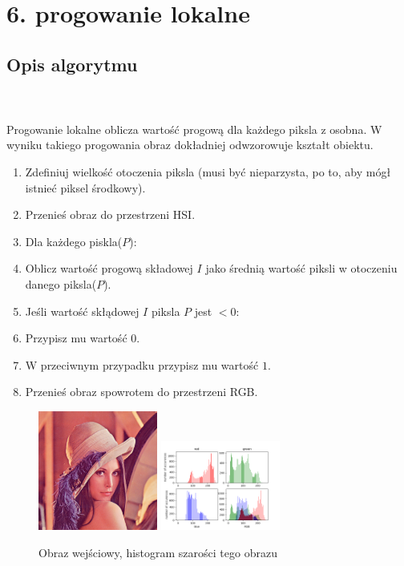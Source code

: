 \documentclass[final,a4paper,openany,12pt]{mwbk}
\begin{document}
\section*{6. progowanie lokalne}
\subsection*{Opis algorytmu}
\hfill
\\\\
\indent Progowanie lokalne oblicza wartość progową dla każdego piksla z osobna. W wyniku takiego progowania obraz dokładniej odwzorowuje kształt obiektu.
\begin{enumerate}
	\item Zdefiniuj wielkość otoczenia piksla (musi być nieparzysta, po to, aby mógł istnieć piksel środkowy).
	\item Przenieś obraz do przestrzeni HSI.
	\item Dla każdego piskla($P$):
	\item Oblicz wartość progową składowej $I$ jako średnią wartość piksli w otoczeniu danego piksla($P$).
	\item Jeśli wartość skłądowej $I$ piksla $P$ jest $< 0$:
	\item Przypisz mu wartość $0$.
	\item W przeciwnym przypadku przypisz mu wartość $1$.
	\item Przenieś obraz spowrotem do przestrzeni RGB.
\end{enumerate}

\begin{figure}[H]
	\begin{center}
		\includegraphics[width=0.35\textwidth]{lena_color}
		\includegraphics[width=0.35\textwidth]{lena_color_histogram}
	\end{center}
	\caption{Obraz wejściowy, histogram szarości tego obrazu}
\end{figure}
\end{document}
